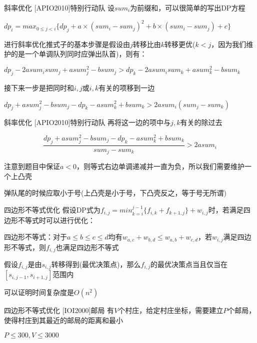 \documentclass[9pt]{beamer}
\begin{document}
  \begin{frame}{斜率优化 [APIO2010]特别行动队}
     设$sum_i$为前缀和，可以很简单的写出DP方程

     $dp_i=max_{0\le j<i}\{dp_j+a\times(sum_i-sum_j)^2+b\times(sum_i-sum_j)+c\}$

     进行斜率优化推式子的基本步骤是假设由$j$转移比由$k$转移更优($k<j$，因为我们维护的是一个单调队列同时应弹出队首)，则有：

     $dp_j-2asum_isum_j+asum_j^2-bsum_j>dp_k-2asum_isum_k+asum_k^2-bsum_k$

     接下来一步是把同时和$i,j$或$i,k$有关的项移到一边

     $dp_j+asum_j^2-bsum_j-dp_k-asum_k^2+bsum_k>2asum_i(sum_j-sum_k)$
  \end{frame}

  \begin{frame}{斜率优化 [APIO2010]特别行动队}
     再将这一边的项中与$j,k$有关的除过去

     $$\frac{dp_j+asum_j^2-bsum_j-dp_k-asum_k^2+bsum_k}{sum_j-sum_k}>2asum_i$$
  
     注意到题目中保证$a<0$，则等式右边单调递减并一直为负，所以我们需要维护一个上凸壳

     弹队尾的时候应取小于号(上凸壳是小于号，下凸壳反之，等于号无所谓)
  \end{frame}

  \begin{frame}{四边形不等式优化}
     假设DP式为$f_{i,j}=min_{k=i}^{j-1}\{f_{i,k}+f_{k+1,j}\}+w_{i,j}$时，若满足四边形不等式时可以进行优化：

     四边形不等式：对于$a\le b\le c \le d$均有$w_{a,c}+w_{b,d}\le w_{a,b}+w_{c,d}$，若$w_{i,j}$满足四边形不等式，则$f_{i,j}$也满足四边形不等式

     假设$f_{i,j}$是由$s_{i,j}$转移得到(最优决策点)，那么$f_{i,j}$的最优决策点当且仅当在$[s_{i,j-1},s_{i+1,j}]$范围内

     可以证明时间复杂度是$O(n^2)$
  \end{frame}

  \begin{frame}{四边形不等式优化 [IOI2000]邮局}
     有$V$个村庄，给定村庄坐标，需要建立$P$个邮局，使得村庄到其最近的邮局的距离和最小

     $P\le 300,V\le 3000$
  \end{frame}
\end{document}
